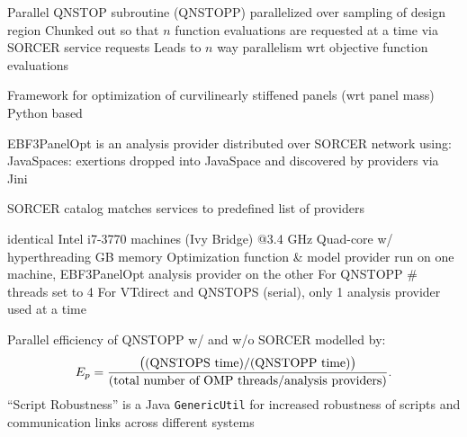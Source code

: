 \bigskip \bigskip
Parallel QNSTOP subroutine (QNSTOPP) parallelized over sampling of
design region
\medskip
\bull Chunked out so that $n$ function evaluations are requested at a
time via SORCER service requests
\medskip
\bull Leads to $n$ way parallelism wrt objective function evaluations
\vfil\eject

\bigskip \bigskip
Framework for optimization of curvilinearly stiffened panels (wrt panel mass)
\bull Python based
\smallskip
{}
\vfil\eject

\bigskip \bigskip
EBF3PanelOpt is an analysis provider distributed over SORCER network using:
\bull JavaSpaces: exertions dropped into JavaSpace and discovered by
providers via Jini
\medskip
{}
\vfil\eject

\bigskip \bigskip
SORCER catalog matches services to predefined list of providers
\medskip
{}
\vfil\eject

\bigskip {} identical Intel i7-3770 machines (Ivy Bridge) @3.4 GHz
\smallskip
\bull Quad-core w/ hyperthreading
\smallskip
{} GB memory
\smallskip
\bull Optimization function \& model provider run on one machine,
EBF3PanelOpt analysis provider on the other
\smallskip
\bull For QNSTOPP \# threads set to 4
\smallskip
\bull For VTdirect and QNSTOPS (serial), only 1 analysis provider
used at a time
\vfil\eject

\bigskip \bigskip
Parallel efficiency of QNSTOPP w/ and w/o SORCER modelled by:
\smallskip
$$
E_p={\bigl((\hbox{QNSTOPS time})/(\hbox{QNSTOPP time})\bigr)
\over (\hbox{total number of OMP threads/analysis providers})}.
$$
\bigskip \bigskip
``Script Robustness'' is a Java {\tt GenericUtil} for increased 
robustness of scripts and communication links across different systems
\vfil\eject

